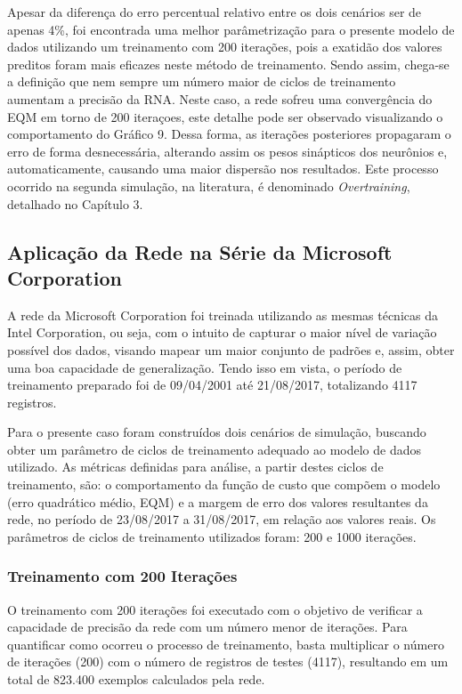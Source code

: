 Apesar da diferença do erro percentual relativo entre os dois cenários ser de apenas 4\%, foi encontrada uma melhor parâmetrização para o presente modelo de dados utilizando um treinamento com 200 iterações, pois a exatidão dos valores preditos foram mais eficazes neste método de treinamento. Sendo assim, chega-se a definição que nem sempre um número maior de ciclos de treinamento aumentam a precisão da RNA. Neste caso, a rede sofreu uma convergência do EQM em torno de 200 iteraçoes, este detalhe pode ser observado visualizando o comportamento do Gráfico 9. Dessa forma, as iterações posteriores propagaram o erro de forma desnecessária, alterando assim os pesos sinápticos dos neurônios e, automaticamente, causando uma maior dispersão nos resultados. Este processo ocorrido na segunda simulação, na literatura, é denominado \textit{Overtraining}, detalhado no Capítulo 3.

\subsection{Aplicação da Rede na Série da Microsoft Corporation}
A rede da Microsoft Corporation foi treinada utilizando as mesmas técnicas da Intel Corporation, ou seja, com o intuito de capturar o maior nível de variação possível dos dados, visando mapear um maior conjunto de padrões e, assim, obter uma boa capacidade de generalização. Tendo isso em vista, o período de treinamento preparado foi de 09/04/2001 até 21/08/2017, totalizando 4117 registros.

Para o presente caso foram construídos dois cenários de simulação, buscando obter um parâmetro de ciclos de treinamento adequado ao modelo de dados utilizado. As métricas definidas para análise, a partir destes ciclos de treinamento, são: o comportamento da função de custo que compõem o modelo (erro quadrático médio, EQM) e a margem de erro dos valores resultantes da rede, no período de 23/08/2017 a 31/08/2017, em relação aos valores reais. Os parâmetros de ciclos de treinamento utilizados foram: 200 e 1000 iterações.

\subsubsection{Treinamento com 200 Iterações}	
O treinamento com 200 iterações foi executado com o objetivo de verificar a capacidade de precisão da rede com um número menor de iterações. Para quantificar como ocorreu o processo de treinamento, basta multiplicar o número de iterações (200) com o número de registros de testes (4117), resultando em um total de 823.400 exemplos calculados pela rede.

